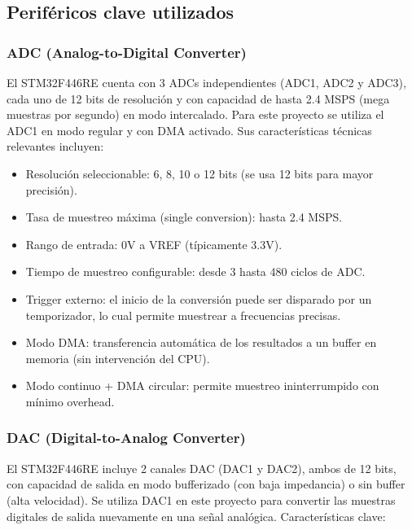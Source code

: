 \documentclass[12pt]{article}
\begin{document}
		\subsection{Periféricos clave utilizados}
	\subsubsection{ADC (Analog-to-Digital Converter)}
	El STM32F446RE cuenta con 3 ADCs independientes (ADC1, ADC2 y ADC3), cada uno de 12 bits de resolución y con capacidad de hasta 2.4 MSPS (mega muestras por segundo) en modo intercalado. Para este proyecto se utiliza el ADC1 en modo regular y con DMA activado. Sus características técnicas relevantes incluyen:
	
	\begin{itemize}
		\item Resolución seleccionable: 6, 8, 10 o 12 bits (se usa 12 bits para mayor precisión).
		
		\item Tasa de muestreo máxima (single conversion): hasta 2.4 MSPS.
		
		\item Rango de entrada: 0V a VREF (típicamente 3.3V).
		
		\item Tiempo de muestreo configurable: desde 3 hasta 480 ciclos de ADC.
		
		\item Trigger externo: el inicio de la conversión puede ser disparado por un temporizador, lo cual permite muestrear a frecuencias precisas.
		
		\item Modo DMA: transferencia automática de los resultados a un buffer en memoria (sin intervención del CPU).
		
		\item Modo continuo + DMA circular: permite muestreo ininterrumpido con mínimo overhead.
	\end{itemize}
	
	\subsubsection{DAC (Digital-to-Analog Converter)}
	El STM32F446RE incluye 2 canales DAC (DAC1 y DAC2), ambos de 12 bits, con capacidad de salida en modo bufferizado (con baja impedancia) o sin buffer (alta velocidad). Se utiliza DAC1 en este proyecto para convertir las muestras digitales de salida nuevamente en una señal analógica. Características clave:
	
\end{document}
